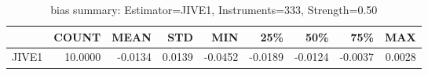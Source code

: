 \begin{table}[ht]
\centering
\caption{bias summary: Estimator=JIVE1, Instruments=333, Strength=0.50}
\begin{tabular}{lrrrrrrrr}
\toprule
 & COUNT & MEAN & STD & MIN & 25\% & 50\% & 75\% & MAX \\
\midrule
JIVE1 & 10.0000 & -0.0134 & 0.0139 & -0.0452 & -0.0189 & -0.0124 & -0.0037 & 0.0028 \\
\bottomrule
\end{tabular}
\end{table}
